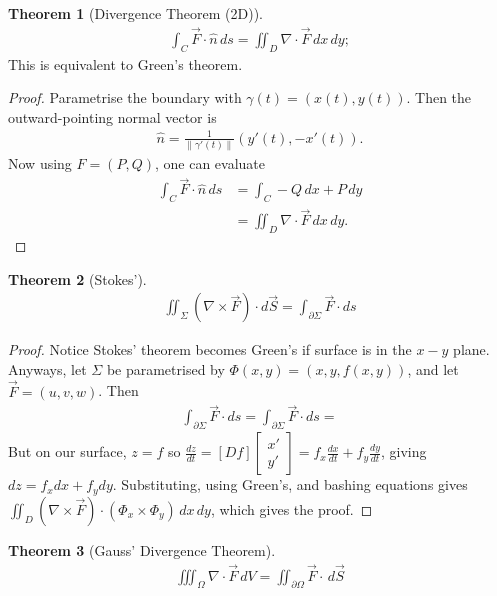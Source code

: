 \documentclass{article}
\theoremstyle{definition}
\newtheorem{thm}{Theorem}[subsubsection]
\begin{document}
\begin{thm}[Divergence Theorem (2D)]
	\begin{align*}
		\int_C\vec F\cdot\hat{n}\,ds=\iint_D\nabla\cdot\vec F\,dx\,dy;
	\end{align*}
	This is equivalent to Green's theorem.
\end{thm}
\begin{proof}
	Parametrise the boundary with $\gamma(t)=\left(x(t),y(t)\right)$. Then the outward-pointing normal vector is
	\begin{align*}
		\hat{n}=\frac{1}{\lVert\gamma'(t)\rVert}(y'(t),-x'(t)).
	\end{align*}
	Now using $F=(P,Q)$, one can evaluate
	\begin{align*}
		\int_C\vec F\cdot\hat{n}\,ds&=\int_C-Q\,dx+P\,dy\\
		&=\iint_D\nabla\cdot\vec F\,dx\,dy.
	\end{align*}
\end{proof}

\begin{thm}[Stokes']
	\begin{align*}
		\iint_\Sigma(\nabla\times\vec F)\cdot d\vec S=\int_{\partial\Sigma}\vec F\cdot ds
	\end{align*}
\end{thm}
\begin{proof}
	Notice Stokes' theorem becomes Green's if surface is in the $x-y$ plane. 
	Anyways, let $\Sigma$ be parametrised by $\Phi(x,y)=(x,y,f(x,y))$, and let $\vec F=(u,v,w)$.
	Then
	\begin{align*}
		\int_{\partial \Sigma}\vec F\cdot ds=\int_{\partial \Sigma}\vec F\cdot ds=
	\end{align*}
	But on our surface, $z=f$ so $\frac{dz}{dt}=[Df]\begin{bmatrix}x'\\y'\end{bmatrix}=f_x\frac{dx}{dt}+f_y\frac{dy}{dt}$, giving $dz=f_xdx+f_ydy$. Substituting, using Green's, and bashing equations gives $\iint_D(\nabla\times\vec F)\cdot(\Phi_x\times\Phi_y)\,dx\,dy$, which gives the proof.
\end{proof}

\begin{thm}[Gauss' Divergence Theorem]
	\begin{align*}
		\iiint_\Omega\nabla\cdot\vec F\,dV=\iint_{\partial\Omega}\vec F\cdot\,d\vec S
	\end{align*}
\end{thm}
\end{document}
